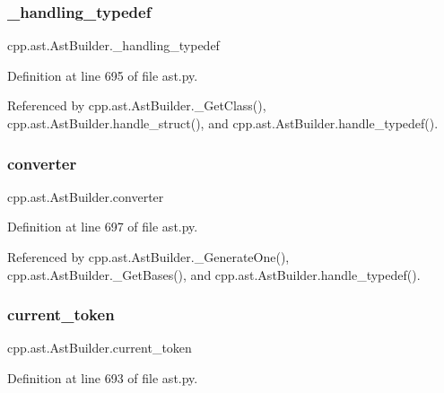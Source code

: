\subsubsection{\texorpdfstring{\+\_\+handling\+\_\+typedef}{\_handling\_typedef}}
{\footnotesize\ttfamily cpp.\+ast.\+Ast\+Builder.\+\_\+handling\+\_\+typedef\hspace{0.3cm}{\ttfamily [private]}}



Definition at line 695 of file ast.\+py.



Referenced by cpp.\+ast.\+Ast\+Builder.\+\_\+\+Get\+Class(), cpp.\+ast.\+Ast\+Builder.\+handle\+\_\+struct(), and cpp.\+ast.\+Ast\+Builder.\+handle\+\_\+typedef().

\mbox{\label{classcpp_1_1ast_1_1AstBuilder_ae8551cf0405bc6e367636b1f3b37d083}} 
\subsubsection{\texorpdfstring{converter}{converter}}
{\footnotesize\ttfamily cpp.\+ast.\+Ast\+Builder.\+converter}



Definition at line 697 of file ast.\+py.



Referenced by cpp.\+ast.\+Ast\+Builder.\+\_\+\+Generate\+One(), cpp.\+ast.\+Ast\+Builder.\+\_\+\+Get\+Bases(), and cpp.\+ast.\+Ast\+Builder.\+handle\+\_\+typedef().

\mbox{\label{classcpp_1_1ast_1_1AstBuilder_a38579523ccc1ae9d202ac722baea45fc}} 
\subsubsection{\texorpdfstring{current\+\_\+token}{current\_token}}
{\footnotesize\ttfamily cpp.\+ast.\+Ast\+Builder.\+current\+\_\+token}



Definition at line 693 of file ast.\+py.




